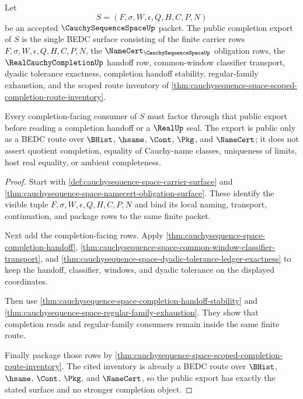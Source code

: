 \begin{theorem}
\label{thm:cauchysequence-space-public-completion-export}
Let
$$
S=(F,\sigma,W,\epsilon,Q,H,C,P,N)
$$
be an accepted $\CauchySequenceSpaceUp$ packet. The public completion export of $S$ is the single BEDC surface consisting of the finite carrier rows $F,\sigma,W,\epsilon,Q,H,C,P,N$, the $\NameCert_{\CauchySequenceSpaceUp}$ obligation rows, the $\RealCauchyCompletionUp$ handoff row, common-window classifier transport, dyadic tolerance exactness, completion handoff stability, regular-family exhaustion, and the scoped route inventory of \autoref{thm:cauchysequence-space-scoped-completion-route-inventory}.

Every completion-facing consumer of $S$ must factor through that public export before reading a completion handoff or a $\RealUp$ seal. The export is public only as a BEDC route over $\BHist$, $\hsame$, $\Cont$, $\Pkg$, and $\NameCert$; it does not assert quotient completion, equality of Cauchy-name classes, uniqueness of limits, host real equality, or ambient completeness.
\end{theorem}
\begin{proof}
Start with \autoref{def:cauchysequence-space-carrier-surface} and \autoref{thm:cauchysequence-space-namecert-obligation-surface}. These identify the visible tuple $F,\sigma,W,\epsilon,Q,H,C,P,N$ and bind its local naming, transport, continuation, and package rows to the same finite packet.

Next add the completion-facing rows. Apply \autoref{thm:cauchysequence-space-completion-handoff}, \autoref{thm:cauchysequence-space-common-window-classifier-transport}, and \autoref{thm:cauchysequence-space-dyadic-tolerance-ledger-exactness} to keep the handoff, classifier, windows, and dyadic tolerance on the displayed coordinates.

Then use \autoref{thm:cauchysequence-space-completion-handoff-stability} and \autoref{thm:cauchysequence-space-regular-family-exhaustion}. They show that completion reads and regular-family consumers remain inside the same finite route.

Finally package those rows by \autoref{thm:cauchysequence-space-scoped-completion-route-inventory}. The cited inventory is already a BEDC route over $\BHist$, $\hsame$, $\Cont$, $\Pkg$, and $\NameCert$, so the public export has exactly the stated surface and no stronger completion object.
\end{proof}

